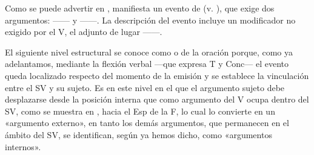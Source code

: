 Como se puede advertir en ,  manifiesta
un evento de  (v. ), que exige dos argumentos:  ------ y  ------. La descripción del evento incluye un modificador no exigido por el
V, el adjunto de lugar ------.

El siguiente nivel estructural se conoce como  o de la
oración porque, como ya adelantamos, mediante la flexión verbal ---que expresa T
y Conc--- el evento queda localizado respecto del momento de la emisión y se
establece la vinculación entre el SV y su sujeto. Es en este nivel en el que el
argumento sujeto debe desplazarse desde la posición interna que como argumento
del V ocupa dentro del SV, como se muestra en , hacia el Esp
de la F, lo cual lo convierte en un «argumento externo», en tanto los demás
argumentos, que permanecen en el ámbito del SV, se identifican, según ya hemos
dicho, como «argumentos internos».

